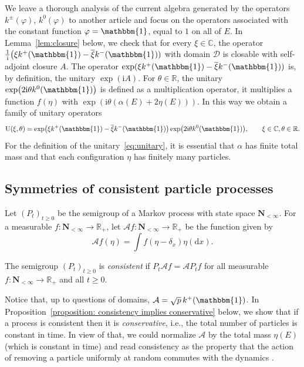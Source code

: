 \documentclass[pdftex]{sigma}
\numberwithin{equation}{section}
\newcommand{\R}{\mathbb{R}}
\newcommand{\C}{\mathbb{C}}
\newcommand{\dd}{\mathrm{d}} %
\newcommand{\1}{\mathbbm{1}}
\begin{document}
We leave a thorough analysis of the current algebra generated by the operators $k^\pm(\varphi)$, $k^0(\varphi)$ to another article \cite{algebraic_Floreani} and focus on the operators associated with the constant function $\varphi = \1$, equal to $1$ on all of $E$. In Lemma~\ref{lem:closure} below, we check that for every $\xi \in \C$, the operator $\frac{1}{\mathrm i} \bigl( \xi k^+(\1) - \overline{\xi} k^-(\1))$ with domain $\mathcal D$ is closable with self-adjoint closure $A$. The operator $\exp( \xi k^+(\1) - \overline{\xi} k^-(\1))$ is, by definition, the unitary $\exp(\mathrm i A)$.
For $\theta \in \R$, the unitary $\exp\bigl( 2\mathrm i \theta k^0(\1)\bigr)$ is defined as a multiplication operator, it multiplies a function $f(\eta)$ with $\exp(\mathrm i \theta (\alpha (E) + 2 \eta(E)))$.
In this way we obtain a family of unitary operators
\begin{equation}\label{eq:unitary}
	{\rm U}(\xi,\theta) = \exp\bigl( \xi k^+(\1) - \overline{\xi} k^-(\1)\bigr) \exp\bigl(2\mathrm i\theta k^0(\1)\bigr),\qquad \xi \in \C,\theta\in \R.
\end{equation}
For the definition of the unitary~\eqref{eq:unitary}, it is essential that $\alpha$ has finite total mass and that each configuration $\eta$ has finitely many particles.

\subsection{Symmetries of consistent particle processes}

Let $(P_t)_{t\geq 0}$ be the semigroup of a Markov process with state space $\mathbf N_{<\infty}$. For a measurable $f\colon \mathbf N_{<\infty} \to \R_+$, let $\mathcal A f\colon \mathbf N_{<\infty} \to \R_+$ be the function given by
\[
	\mathcal A f(\eta) = \int f(\eta-\delta_x)\eta(\dd x).
\]

\begin{Definition}
 The semigroup $(P_t)_{t\geq 0}$ is \emph{consistent} if $P_t \mathcal A f = \mathcal A P_t f$ for all measurable $f\colon \mathbf N_{<\infty}\to \R_+$ and all $t\geq 0$.
\end{Definition}

Notice that, up to questions of domains, $\mathcal A = \sqrt p\, k^+(\1)$. In Proposition~\ref{proposition: consistency implies conservative} below, we show that if a process is consistent then it is \emph{conservative}, i.e., the total number of particles is constant in time. In view of that, we could normalize $\mathcal A$ by the total mass $\eta(E)$ (which is constant in time) and read consistency as the property that the action of removing a particle uniformly at random commutes with the dynamics \cite{carinci2021consistent,IntertwiningConsistent}.
\end{document}
